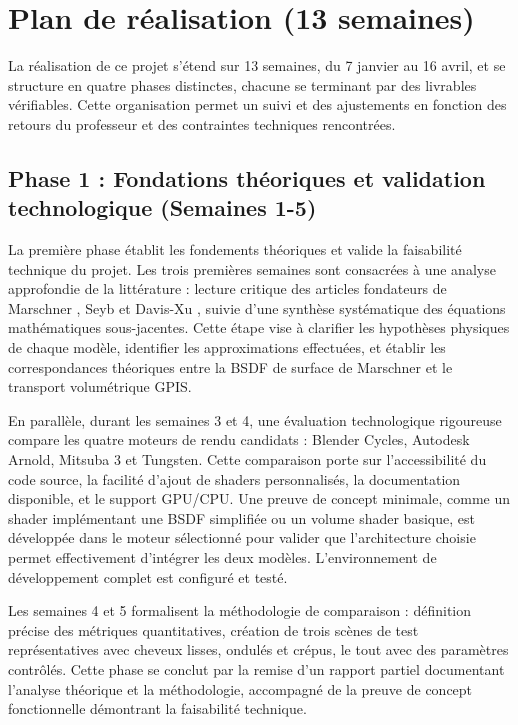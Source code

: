 \documentclass[12pt,a4paper,french]{article}
\begin{document}
\section{Plan de réalisation (13 semaines)}

La réalisation de ce projet s'étend sur 13 semaines, du 7 janvier au 16 avril, et se structure en quatre phases distinctes, chacune se terminant par des livrables vérifiables.
Cette organisation permet un suivi et des ajustements en fonction des retours du professeur et des contraintes techniques rencontrées.

\subsection{Phase 1 : Fondations théoriques et validation technologique (Semaines 1-5)}

La première phase établit les fondements théoriques et valide la faisabilité technique du projet. Les trois premières semaines sont consacrées à une analyse approfondie de la littérature : lecture critique des articles fondateurs de Marschner \cite{marschner2003}, Seyb \cite{seyb24from} et Davis-Xu \cite{davis2014generalized}, suivie d'une synthèse systématique des équations mathématiques sous-jacentes.
Cette étape vise à clarifier les hypothèses physiques de chaque modèle, identifier les approximations effectuées, et établir les correspondances théoriques entre la BSDF de surface de Marschner et le transport volumétrique GPIS.

En parallèle, durant les semaines 3 et 4, une évaluation technologique rigoureuse compare les quatre moteurs de rendu candidats : Blender Cycles, Autodesk Arnold, Mitsuba 3 et Tungsten.
Cette comparaison porte sur l'accessibilité du code source, la facilité d'ajout de shaders personnalisés, la documentation disponible, et le support GPU/CPU.
Une preuve de concept minimale, comme un shader implémentant une BSDF simplifiée ou un volume shader basique, est développée dans le moteur sélectionné pour valider que l'architecture choisie permet effectivement d'intégrer les deux modèles.
L'environnement de développement complet est configuré et testé.

Les semaines 4 et 5 formalisent la méthodologie de comparaison : définition précise des métriques quantitatives, création de trois scènes de test représentatives avec cheveux lisses, ondulés et crépus, le tout avec des paramètres contrôlés.
Cette phase se conclut par la remise d'un rapport partiel documentant l'analyse théorique et la méthodologie, accompagné de la preuve de concept fonctionnelle démontrant la faisabilité technique.
\end{document}
